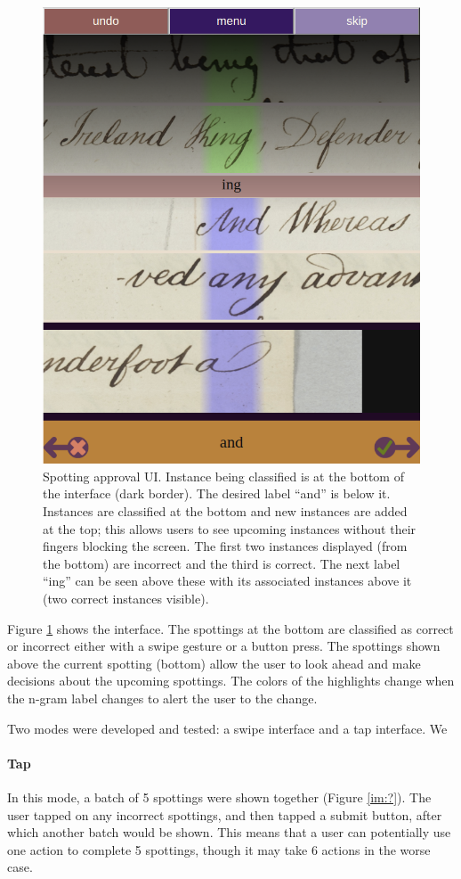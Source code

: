\documentclass[ms,electronic,twosidetoc,letterpaper,chaptercenter,parttop,lof,lot]{byumsphd}
\begin{document}
\begin{figure}
    \centering
    \includegraphics[width=.75\textwidth]{spottingapproval}
    \caption{Spotting approval UI. Instance being classified is at the bottom of the interface (dark border). The desired label ``and'' is below it. Instances are classified at the bottom and new instances are added at the top; this allows users to see upcoming instances without their fingers blocking the screen. The first two instances displayed (from the bottom) are incorrect and the third is correct. The next label ``ing'' can be seen above these with its associated instances above it (two correct instances visible).
    }
    \label{fig:spottingapproval}
\end{figure}

Figure \ref{fig:spottingapproval} shows the interface. The spottings at the bottom are classified as correct or incorrect either with a swipe gesture or a button press. The spottings shown above the current spotting (bottom) allow the user to look ahead and make decisions about the upcoming spottings. The colors of the highlights change when the n-gram label changes to alert the user to the change.



\iffalse
Two modes were developed and tested: a swipe interface and a tap interface. We

\paragraph{Tap}
In this mode, a batch of 5 spottings were shown together (Figure \ref{im:?}). The user tapped on any incorrect spottings, and then tapped a submit button, after which another batch would be shown. This means that a user can potentially use one action to complete 5 spottings, though it may take 6 actions in the worse case.
\end{document}
